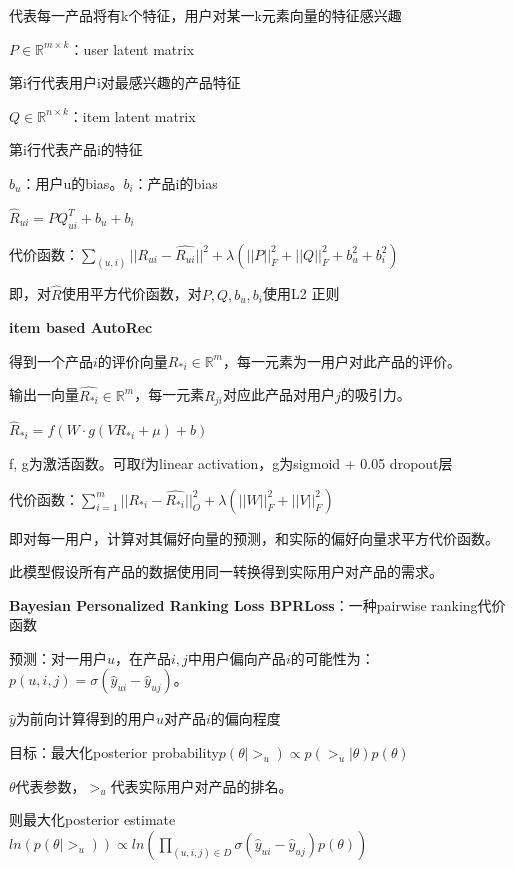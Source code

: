 \documentclass[UTF8]{ctexart}
\begin{document}
  \quad \quad \quad 代表每一产品将有k个特征，用户对某一k元素向量的特征感兴趣

  \quad \quad $P \in \mathbb{R}^{m \times k}$：user latent matrix

  \quad \quad \quad 第i行代表用户i对最感兴趣的产品特征

  \quad \quad $Q \in \mathbb{R}^{n \times k}$：item latent matrix

  \quad \quad \quad 第i行代表产品i的特征

  \quad \quad $b_u$：用户u的bias。$b_i$：产品i的bias

  \quad \quad $\hat{R}_{ui} = PQ^T_{ui} + b_u + b_i$

  \quad 代价函数：$\sum_{(u, i)} ||R_{ui} - \hat{R_{ui}}||^2 + \lambda(||P||_F^2 + ||Q||_F^2 + b_u^2 + b_i^2)$

  \quad \quad 即，对$\hat{R}$使用平方代价函数，对$P, Q, b_u, b_i$使用L2 正则 

  \textbf{item based AutoRec}

  \quad 得到一个产品$i$的评价向量$R_{*i} \in \mathbb{R}^m$，每一元素为一用户对此产品的评价。
  
  \quad 输出一向量$\hat{R_{*i}} \in \mathbb{R}^m$，每一元素$R_{ji}$对应此产品对用户$j$的吸引力。

  \quad $\hat{R}_{*i} = f(W \cdot g(VR_{*i} + \mu) + b)$

  \quad \quad f, g为激活函数。可取f为linear activation，g为sigmoid + 0.05 dropout层

  \quad 代价函数：$\sum_{i=1}^{m}||R_{*i} - \hat{R_{*i}}||_O^2 + \lambda (||W||_F^2 + ||V||_F^2)$

  \quad \quad 即对每一用户，计算对其偏好向量的预测，和实际的偏好向量求平方代价函数。

  \quad \quad 此模型假设所有产品的数据使用同一转换得到实际用户对产品的需求。

  \textbf{Bayesian Personalized Ranking Loss BPRLoss}：一种pairwise ranking代价函数

  \quad 预测：对一用户$u$，在产品$i, j$中用户偏向产品$i$的可能性为：$p(u, i, j) = \sigma(\hat{y}_{ui} - \hat{y}_{uj})$。
  
  \quad \quad $\hat{y}$为前向计算得到的用户$u$对产品$i$的偏向程度

  \quad 目标：最大化posterior probability$p(\theta | >_u) \propto p(>_u | \theta)p(\theta)$

  \quad \quad $\theta$代表参数，$>_u$代表实际用户对产品的排名。

  \quad \quad 则最大化posterior estimate$ln(p(\theta | >_u)) \propto ln(\prod_{(u, i, j) \in D} \sigma(\hat{y}_{ui} - \hat{y}_{uj})p(\theta))$
\end{document}
